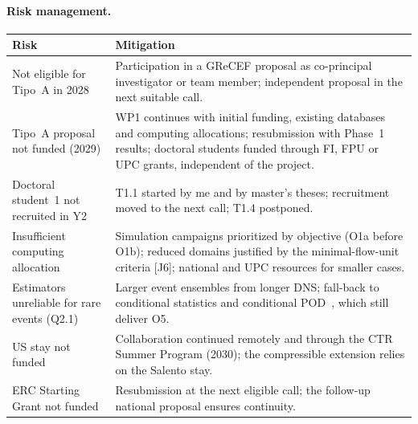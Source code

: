 \documentclass[11pt]{article}
\begin{document}
\paragraph{Risk management.}
\begin{center}\small
\begin{tabularx}{\textwidth}{@{}>{\raggedright\arraybackslash}p{4.4cm}X@{}}
\toprule
\textbf{Risk} & \textbf{Mitigation} \\
\midrule
Not eligible for Tipo~A in 2028 & Participation in a GReCEF proposal as co-principal investigator or team member; independent proposal in the next suitable call. \\
Tipo~A proposal not funded (2029) & WP1 continues with initial funding, existing databases and computing allocations; resubmission with Phase~1 results; doctoral students funded through FI, FPU or UPC grants, independent of the project. \\
Doctoral student~1 not recruited in Y2 & T1.1 started by me and by master's theses; recruitment moved to the next call; T1.4 postponed. \\
Insufficient computing allocation & Simulation campaigns prioritized by objective (O1a before O1b); reduced domains justified by the minimal-flow-unit criteria [J6]; national and UPC resources for smaller cases. \\
Estimators unreliable for rare events (Q2.1) & Larger event ensembles from longer DNS; fall-back to conditional statistics and conditional POD~\cite{Martin2025}, which still deliver O5. \\
US stay not funded & Collaboration continued remotely and through the CTR Summer Program (2030); the compressible extension relies on the Salento stay. \\
ERC Starting Grant not funded & Resubmission at the next eligible call; the follow-up national proposal ensures continuity. \\
\bottomrule
\end{tabularx}
\end{center}
\end{document}
